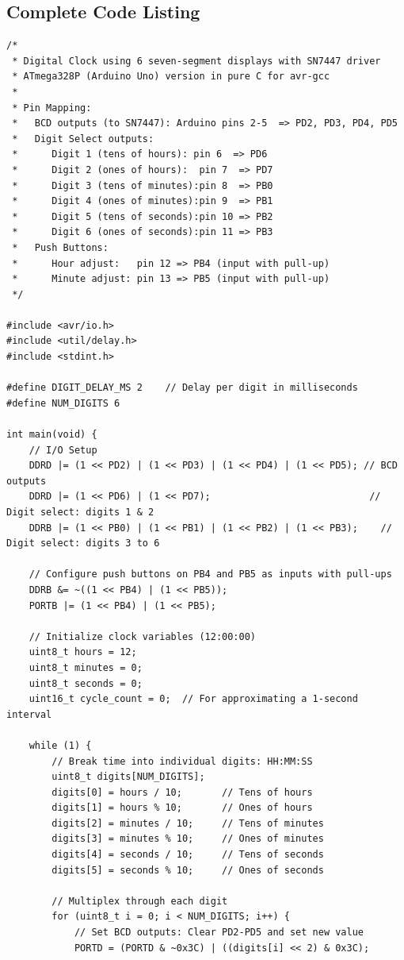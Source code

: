 \documentclass[12pt]{article}
\begin{document}
\subsection{Complete Code Listing}
\begin{lstlisting}[caption={Digital Clock Code in AVR C}, label=lst:clock]
/*
 * Digital Clock using 6 seven-segment displays with SN7447 driver
 * ATmega328P (Arduino Uno) version in pure C for avr-gcc
 *
 * Pin Mapping:
 *   BCD outputs (to SN7447): Arduino pins 2-5  => PD2, PD3, PD4, PD5
 *   Digit Select outputs:
 *      Digit 1 (tens of hours): pin 6  => PD6
 *      Digit 2 (ones of hours):  pin 7  => PD7
 *      Digit 3 (tens of minutes):pin 8  => PB0
 *      Digit 4 (ones of minutes):pin 9  => PB1
 *      Digit 5 (tens of seconds):pin 10 => PB2
 *      Digit 6 (ones of seconds):pin 11 => PB3
 *   Push Buttons:
 *      Hour adjust:   pin 12 => PB4 (input with pull-up)
 *      Minute adjust: pin 13 => PB5 (input with pull-up)
 */

#include <avr/io.h>
#include <util/delay.h>
#include <stdint.h>

#define DIGIT_DELAY_MS 2    // Delay per digit in milliseconds
#define NUM_DIGITS 6

int main(void) {
    // I/O Setup
    DDRD |= (1 << PD2) | (1 << PD3) | (1 << PD4) | (1 << PD5); // BCD outputs
    DDRD |= (1 << PD6) | (1 << PD7);                            // Digit select: digits 1 & 2
    DDRB |= (1 << PB0) | (1 << PB1) | (1 << PB2) | (1 << PB3);    // Digit select: digits 3 to 6

    // Configure push buttons on PB4 and PB5 as inputs with pull-ups
    DDRB &= ~((1 << PB4) | (1 << PB5));  
    PORTB |= (1 << PB4) | (1 << PB5);

    // Initialize clock variables (12:00:00)
    uint8_t hours = 12;
    uint8_t minutes = 0;
    uint8_t seconds = 0;
    uint16_t cycle_count = 0;  // For approximating a 1-second interval

    while (1) {
        // Break time into individual digits: HH:MM:SS
        uint8_t digits[NUM_DIGITS];
        digits[0] = hours / 10;       // Tens of hours
        digits[1] = hours % 10;       // Ones of hours
        digits[2] = minutes / 10;     // Tens of minutes
        digits[3] = minutes % 10;     // Ones of minutes
        digits[4] = seconds / 10;     // Tens of seconds
        digits[5] = seconds % 10;     // Ones of seconds

        // Multiplex through each digit
        for (uint8_t i = 0; i < NUM_DIGITS; i++) {
            // Set BCD outputs: Clear PD2-PD5 and set new value
            PORTD = (PORTD & ~0x3C) | ((digits[i] << 2) & 0x3C);
            

\end{lstlisting}
\end{document}
